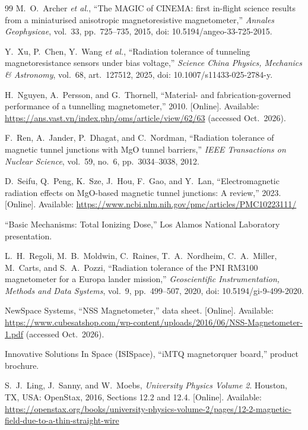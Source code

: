 \documentclass[12pt,a4paper]{article}
\begin{document}
\begin{thebibliography}{99}
M.\ O.\ Archer \emph{et al.}, ``The MAGIC of CINEMA: first in-flight science results from a miniaturised anisotropic magnetoresistive magnetometer,'' \emph{Annales Geophysicae}, vol.~33, pp.~725--735, 2015, doi: 10.5194/angeo-33-725-2015.

Y.\ Xu, P.\ Chen, Y.\ Wang \emph{et al.}, ``Radiation tolerance of tunneling magnetoresistance sensors under bias voltage,'' \emph{Science China Physics, Mechanics \& Astronomy}, vol.~68, art.~127512, 2025, doi: 10.1007/s11433-025-2784-y.

H.\ Nguyen, A.\ Persson, and G.\ Thornell, ``Material- and fabrication-governed performance of a tunnelling magnetometer,'' 2010. [Online]. Available: \url{https://ans.vast.vn/index.php/oms/article/view/62/63} (accessed Oct.\ 2026).

F.\ Ren, A.\ Jander, P.\ Dhagat, and C.\ Nordman, ``Radiation tolerance of magnetic tunnel junctions with MgO tunnel barriers,'' \emph{IEEE Transactions on Nuclear Science}, vol.~59, no.~6, pp.~3034--3038, 2012.

D.\ Seifu, Q.\ Peng, K.\ Sze, J.\ Hou, F.\ Gao, and Y.\ Lan, ``Electromagnetic radiation effects on MgO-based magnetic tunnel junctions: A review,'' 2023. [Online]. Available: \url{https://www.ncbi.nlm.nih.gov/pmc/articles/PMC10223111/}

``Basic Mechanisms: Total Ionizing Dose,'' Los Alamos National Laboratory presentation.

L.\ H.\ Regoli, M.\ B.\ Moldwin, C.\ Raines, T.\ A.\ Nordheim, C.\ A.\ Miller, M.\ Carts, and S.\ A.\ Pozzi, ``Radiation tolerance of the PNI RM3100 magnetometer for a Europa lander mission,'' \emph{Geoscientific Instrumentation, Methods and Data Systems}, vol.~9, pp.~499--507, 2020, doi: 10.5194/gi-9-499-2020.

NewSpace Systems, ``NSS Magnetometer,'' data sheet. [Online]. Available: \url{https://www.cubesatshop.com/wp-content/uploads/2016/06/NSS-Magnetometer-1.pdf} (accessed Oct.\ 2026).

Innovative Solutions In Space (ISISpace), ``iMTQ magnetorquer board,'' product brochure.

S.\ J.\ Ling, J.\ Sanny, and W.\ Moebs, \emph{University Physics Volume 2}. Houston, TX, USA: OpenStax, 2016, Sections 12.2 and 12.4. [Online]. Available: \url{https://openstax.org/books/university-physics-volume-2/pages/12-2-magnetic-field-due-to-a-thin-straight-wire}


\end{thebibliography}
\end{document}
